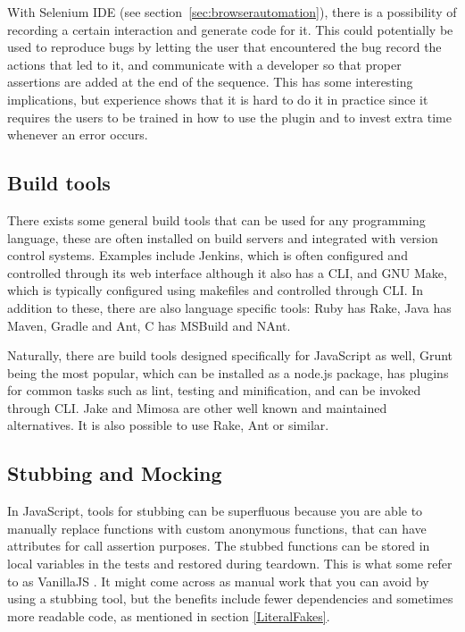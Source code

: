 \documentclass[11pt]{article}
\begin{document}
With Selenium IDE (see section~\ref{sec:browserautomation}), there is a possibility of recording a certain interaction and generate code for it. This could potentially be used to reproduce bugs by letting the user that encountered the bug record the actions that led to it, and communicate with a developer so that proper assertions are added at the end of the sequence. This has some interesting implications, but experience shows that it is hard to do it in practice since it requires the users to be trained in how to use the plugin and to invest extra time whenever an error occurs. \cite[questions~42-43]{Edelstam}

\subsection{Build tools} %

There exists some general build tools that can be used for any programming language, these are often installed on build servers and integrated with version control systems. Examples include Jenkins, which is often configured and controlled through its web interface although it also has a CLI, and GNU Make, which is typically configured using makefiles and controlled through CLI. In addition to these, there are also language specific tools: Ruby has Rake, Java has Maven, Gradle and Ant, C\nolinebreak\hspace{-.05em}\raisebox{.3ex}{\scriptsize\bf \#} has MSBuild and NAnt.

Naturally, there are build tools designed specifically for JavaScript as well, Grunt being the most popular, which can be installed as a node.js package, has plugins for common tasks such as lint, testing and minification, and can be invoked through CLI. \cite{Grunt}\cite[question~52]{Edelstam} Jake and Mimosa are other well known and maintained alternatives. It is also possible to use Rake, Ant or similar. \cite{BuildTools}

\subsection{Stubbing and Mocking} %

In JavaScript, tools for stubbing can be superfluous because you are able to manually replace functions with custom anonymous functions, that can have attributes for call assertion purposes. The stubbed functions can be stored in local variables in the tests and restored during teardown. This is what some refer to as VanillaJS \cite[question~53]{Edelstam}. It might come across as manual work that you can avoid by using a stubbing tool, but the benefits include fewer dependencies and sometimes more readable code, as mentioned in section \ref{LiteralFakes}. \cite[questions~54-55]{Edelstam}
\end{document}
